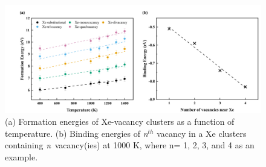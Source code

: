 \documentclass[preprint,12pt]{elsarticle}
\begin{document}
\begin{figure}[hbt!]
\centering
\includegraphics[width=1\textwidth]{Fig7.png}
\caption{(a) Formation energies of Xe-vacancy clusters as a function of temperature. (b) Binding energies of \textit{n}$^{th}$ vacancy in a Xe clusters containing $\it{n}$ vacancy(ies) at 1000 K, where n= 1, 2, 3, and 4 as an example.}
\label{fig:FEBE77}
\end{figure}
\end{document}
